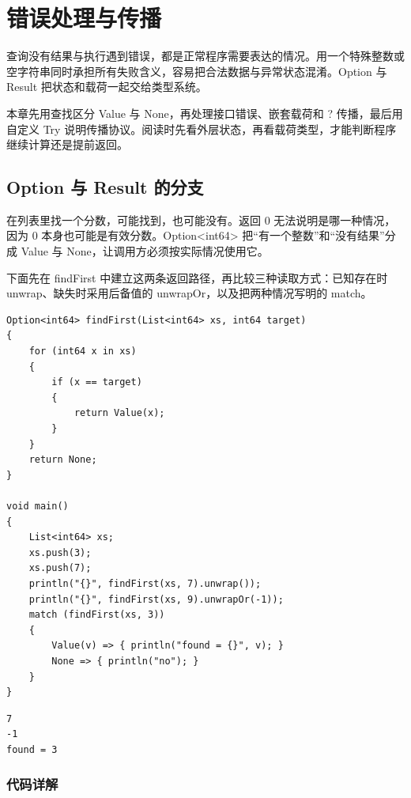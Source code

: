 \chapter{错误处理与传播}
\label{ch:16}

查询没有结果与执行遇到错误，都是正常程序需要表达的情况。用一个特殊整数或空字符串同时承担所有失败含义，容易把合法数据与异常状态混淆。Option 与 Result 把状态和载荷一起交给类型系统。

本章先用查找区分 Value 与 None，再处理接口错误、嵌套载荷和 ? 传播，最后用自定义 Try 说明传播协议。阅读时先看外层状态，再看载荷类型，才能判断程序继续计算还是提前返回。

\section{Option 与 Result 的分支}

在列表里找一个分数，可能找到，也可能没有。返回 0 无法说明是哪一种情况，因为 0 本身也可能是有效分数。Option<int64> 把“有一个整数”和“没有结果”分成 Value 与 None，让调用方必须按实际情况使用它。

下面先在 findFirst 中建立这两条返回路径，再比较三种读取方式：已知存在时 unwrap、缺失时采用后备值的 unwrapOr，以及把两种情况写明的 match。

\par
\medskip
\begin{lstlisting}[style=chali]
Option<int64> findFirst(List<int64> xs, int64 target)
{
    for (int64 x in xs)
    {
        if (x == target)
        {
            return Value(x);
        }
    }
    return None;
}

void main()
{
    List<int64> xs;
    xs.push(3);
    xs.push(7);
    println("{}", findFirst(xs, 7).unwrap());
    println("{}", findFirst(xs, 9).unwrapOr(-1));
    match (findFirst(xs, 3))
    {
        Value(v) => { println("found = {}", v); }
        None => { println("no"); }
    }
}
\end{lstlisting}
\par
\medskip

\par
\medskip
\begin{lstlisting}[style=out]
7
-1
found = 3
\end{lstlisting}
\par
\medskip

\subsection*{代码详解}

